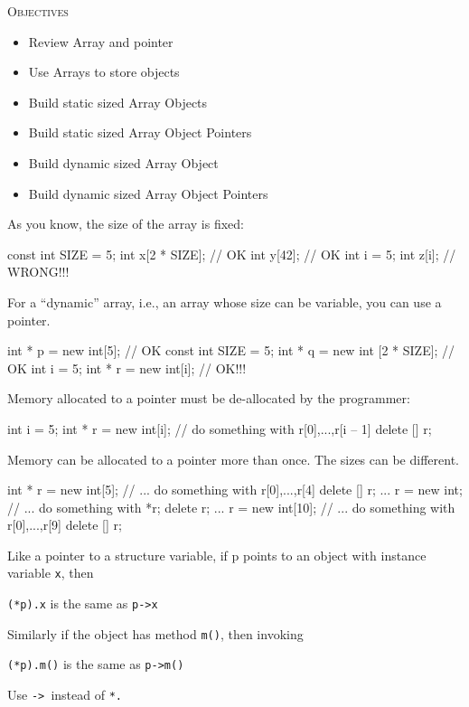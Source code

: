 \newpage{}

\textsc{Objectives}

\begin{itemize}
\item
  Review Array and pointer
\item
  Use Arrays to store objects
\item
  Build static sized Array Objects
\item
  Build static sized Array Object Pointers
\item
  Build dynamic sized Array Object
\item
  Build dynamic sized Array Object Pointers
\end{itemize}

\newpage{}

As you know, the size of the array is fixed:
\begin{console}
const int SIZE = 5;
int x[2 * SIZE];        // OK
int y[42];              // OK
int i = 5;
int z[i];               // WRONG!!!
\end{console}
For a ``dynamic'' array, i.e., an array whose size can be variable, you
can use a pointer.
\begin{console}
int * p = new int[5];         // OK
const int SIZE = 5;
int * q = new int [2 * SIZE]; // OK
int i = 5;
int * r = new int[i]; // OK!!!
\end{console}
Memory allocated to a pointer must be de-allocated by the programmer:

\begin{console}
int i = 5;
int * r = new int[i];
// do something with r[0],...,r[i -- 1]
delete [] r;
\end{console}
Memory can be allocated to a pointer more than once. The sizes can be
different.

\begin{console}
int * r = new int[5];
// ... do something with r[0],...,r[4]
delete [] r;
...
r = new int;
// ... do something with *r;
delete r;
...
r = new int[10];
// ... do something with r[0],...,r[9]
delete [] r;
\end{console}
Like a pointer to a structure variable, if p points to an object with
instance variable \texttt{x}, then
\begin{center}
\verb!(*p).x! is the same as \verb!p->x!
\end{center}
Similarly if the object has method \texttt{m()}, then invoking
\begin{center}
\texttt{(*p).m()} is the same as \texttt{p->m()}
\end{center}
Use \texttt{-> }instead of \texttt{*.}

